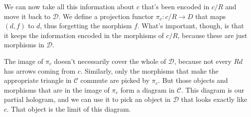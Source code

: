 \documentclass[11pt]{amsart}
\newcommand{\cat}[1]{\mathcal{#1}}
\begin{document}
We can now take all this information about $c$ that's been encoded in $c/R$ and move it back to $\cat D$. We define a projection functor $\pi_c \colon c/R \to D$ that maps $(d, f)$ to $d$, thus forgetting the morphism $f$. What's important, though, is that it keeps the information encoded in the morphisms of $c/R$, because these are just morphisms in $\cat D$.

\begin{figure}[H]
\end{figure}

The image of $\pi_c$ doesn't necessarily cover the whole of $\cat D$, because not every $R d$ has arrows coming from $c$. Similarly, only the morphisms that make the appropriate triangle in $\cat C$ commute are picked by $\pi_c$. But those objects and morphisms that are in the image of $\pi_c$ form a diagram in $\cat C$. This diagram is our partial hologram, and we can use it to pick an object in $\cat D$ that looks exactly like $c$. That object is the limit of this diagram. 
\end{document}
